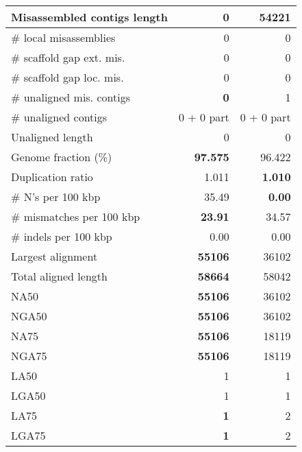 \documentclass[12pt,a4paper]{article}
\begin{document}
\begin{table}[ht]
\begin{center}
\begin{tabular}{|l*{2}{|r}|}
Misassembled contigs length & {\bf 0} & 54221 \\ \hline
\# local misassemblies & 0 & 0 \\ \hline
\# scaffold gap ext. mis. & 0 & 0 \\ \hline
\# scaffold gap loc. mis. & 0 & 0 \\ \hline
\# unaligned mis. contigs & {\bf 0} & 1 \\ \hline
\# unaligned contigs & 0 + 0 part & 0 + 0 part \\ \hline
Unaligned length & 0 & 0 \\ \hline
Genome fraction (\%) & {\bf 97.575} & 96.422 \\ \hline
Duplication ratio & 1.011 & {\bf 1.010} \\ \hline
\# N's per 100 kbp & 35.49 & {\bf 0.00} \\ \hline
\# mismatches per 100 kbp & {\bf 23.91} & 34.57 \\ \hline
\# indels per 100 kbp & 0.00 & 0.00 \\ \hline
Largest alignment & {\bf 55106} & 36102 \\ \hline
Total aligned length & {\bf 58664} & 58042 \\ \hline
NA50 & {\bf 55106} & 36102 \\ \hline
NGA50 & {\bf 55106} & 36102 \\ \hline
NA75 & {\bf 55106} & 18119 \\ \hline
NGA75 & {\bf 55106} & 18119 \\ \hline
LA50 & 1 & 1 \\ \hline
LGA50 & 1 & 1 \\ \hline
LA75 & {\bf 1} & 2 \\ \hline
LGA75 & {\bf 1} & 2 \\ \hline
\end{tabular}
\end{center}
\end{table}
\end{document}
